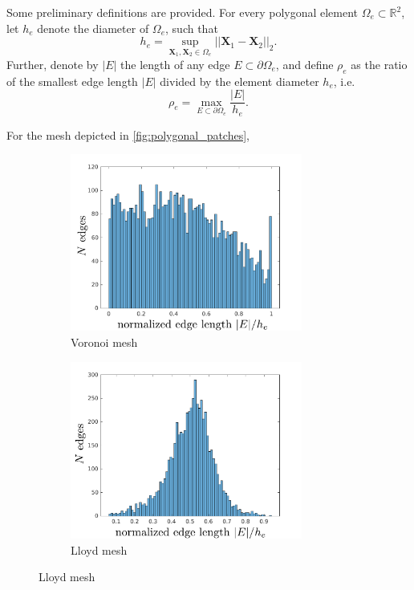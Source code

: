 Some preliminary definitions are provided. For every polygonal element $\Omega_e \subset \mathbb{R}^2$, let $h_e$ denote the diameter of $\Omega_e$, such that
\begin{equation}
	h_e = \sup_{\mathbf{X}_1, \mathbf{X}_2 \in \Omega_e} || \mathbf{X}_1 - \mathbf{X}_2 ||_2.
\end{equation}
Further, denote by $|E|$ the length of any edge $E \subset \partial \Omega_e$, and define $\rho_e$ as the ratio of the smallest edge length $|E|$ divided by the element diameter $h_e$, i.e.
\begin{equation}
	\rho_e = \max_{E \subset \partial \Omega_e} \frac{|E|}{h_e}.
\end{equation}

For the mesh depicted in \ref{fig:polygonal_patches}, 
\begin{figure}[!h]
    \centering
    \begin{subfigure}[b]{0.49\linewidth}
            \centering
            \includegraphics[width=3.0in]{figures/patch_edge_lengths.pdf}
    			\caption{Voronoi mesh \label{fig:patch_edge_lengths}}
    \end{subfigure}
	\begin{subfigure}[b]{0.49\linewidth}
            \centering
            \includegraphics[width=3.0in]{figures/lloyd_edge_lengths.pdf}
    			\caption{Lloyd mesh \label{fig:lloyd_edge_lengths}}
    \end{subfigure}

\end{figure}
